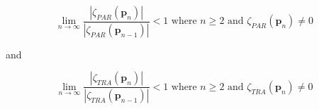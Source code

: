 \begin{equation}
	\lim_{n\to\infty} \frac{|\zeta_\textit{PAR}(\textbf{p}_n)|}{|\zeta_\textit{PAR}(\textbf{p}_{n-1})|} < 1 \text{ where } n \geq 2 \text{ and } \zeta_\textit{PAR}(\textbf{p}_n) \neq 0
	\label{ch3:equ:convergence-criterion-par}
\end{equation}

and

\begin{equation}
	\lim_{n\to\infty} \frac{|\zeta_\textit{TRA}(\textbf{p}_n)|}{|\zeta_\textit{TRA}(\textbf{p}_{n-1})|} < 1 \text{ where } n \geq 2 \text{ and } \zeta_\textit{TRA}(\textbf{p}_n) \neq 0
	\label{ch3:equ:convergence-criterion-tra}
\end{equation}